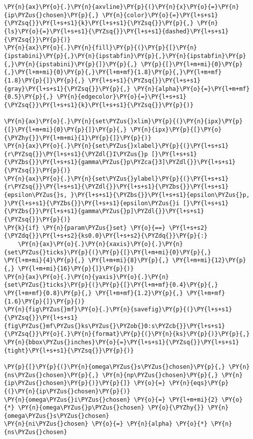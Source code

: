 \begin{Verbatim}[commandchars=\\\{\}]
\PY{n}{ax}\PY{o}{.}\PY{n}{axvline}\PY{p}{(}\PY{n}{x}\PY{o}{=}\PY{n}{ip\PYZus{}chosen}\PY{p}{,} \PY{n}{color}\PY{o}{=}\PY{l+s+s1}{\PYZsq{}}\PY{l+s+s1}{k}\PY{l+s+s1}{\PYZsq{}}\PY{p}{,} \PY{n}{ls}\PY{o}{=}\PY{l+s+s1}{\PYZsq{}}\PY{l+s+s1}{dashed}\PY{l+s+s1}{\PYZsq{}}\PY{p}{)}
\PY{n}{ax}\PY{o}{.}\PY{n}{fill}\PY{p}{(}\PY{p}{[}\PY{n}{ipstabini}\PY{p}{,}\PY{n}{ipstabfin}\PY{p}{,}\PY{n}{ipstabfin}\PY{p}{,}\PY{n}{ipstabini}\PY{p}{]}\PY{p}{,} \PY{p}{[}\PY{l+m+mi}{0}\PY{p}{,}\PY{l+m+mi}{0}\PY{p}{,}\PY{l+m+mf}{1.8}\PY{p}{,}\PY{l+m+mf}{1.8}\PY{p}{]}\PY{p}{,} \PY{l+s+s1}{\PYZsq{}}\PY{l+s+s1}{gray}\PY{l+s+s1}{\PYZsq{}}\PY{p}{,} \PY{n}{alpha}\PY{o}{=}\PY{l+m+mf}{0.5}\PY{p}{,} \PY{n}{edgecolor}\PY{o}{=}\PY{l+s+s1}{\PYZsq{}}\PY{l+s+s1}{k}\PY{l+s+s1}{\PYZsq{}}\PY{p}{)}

\PY{n}{ax}\PY{o}{.}\PY{n}{set\PYZus{}xlim}\PY{p}{(}\PY{n}{ipx}\PY{p}{[}\PY{l+m+mi}{0}\PY{p}{]}\PY{p}{,} \PY{n}{ipx}\PY{p}{[}\PY{o}{\PYZhy{}}\PY{l+m+mi}{1}\PY{p}{]}\PY{p}{)}
\PY{n}{ax}\PY{o}{.}\PY{n}{set\PYZus{}xlabel}\PY{p}{(}\PY{l+s+s1}{r\PYZsq{}}\PY{l+s+s1}{\PYZdl{}I\PYZus{}p [}\PY{l+s+s1}{\PYZbs{}}\PY{l+s+s1}{gamma\PYZus{}p\PYZca{}3]\PYZdl{}}\PY{l+s+s1}{\PYZsq{}}\PY{p}{)}
\PY{n}{ax}\PY{o}{.}\PY{n}{set\PYZus{}ylabel}\PY{p}{(}\PY{l+s+s1}{r\PYZsq{}}\PY{l+s+s1}{\PYZdl{}}\PY{l+s+s1}{\PYZbs{}}\PY{l+s+s1}{epsilon\PYZus{}s, }\PY{l+s+s1}{\PYZbs{}}\PY{l+s+s1}{epsilon\PYZus{}p, }\PY{l+s+s1}{\PYZbs{}}\PY{l+s+s1}{epsilon\PYZus{}i [}\PY{l+s+s1}{\PYZbs{}}\PY{l+s+s1}{gamma\PYZus{}p]\PYZdl{}}\PY{l+s+s1}{\PYZsq{}}\PY{p}{)}
\PY{k}{if} \PY{n}{param\PYZus{}set} \PY{o}{==} \PY{l+s+s2}{\PYZdq{}}\PY{l+s+s2}{ks0.0}\PY{l+s+s2}{\PYZdq{}}\PY{p}{:}
    \PY{n}{ax}\PY{o}{.}\PY{n}{xaxis}\PY{o}{.}\PY{n}{set\PYZus{}ticks}\PY{p}{(}\PY{p}{[}\PY{l+m+mi}{0}\PY{p}{,} \PY{l+m+mi}{4}\PY{p}{,} \PY{l+m+mi}{8}\PY{p}{,} \PY{l+m+mi}{12}\PY{p}{,} \PY{l+m+mi}{16}\PY{p}{]}\PY{p}{)}
\PY{n}{ax}\PY{o}{.}\PY{n}{yaxis}\PY{o}{.}\PY{n}{set\PYZus{}ticks}\PY{p}{(}\PY{p}{[}\PY{l+m+mf}{0.4}\PY{p}{,} \PY{l+m+mf}{0.8}\PY{p}{,} \PY{l+m+mf}{1.2}\PY{p}{,} \PY{l+m+mf}{1.6}\PY{p}{]}\PY{p}{)}
\PY{n}{fig\PYZus{}mf}\PY{o}{.}\PY{n}{savefig}\PY{p}{(}\PY{l+s+s1}{\PYZsq{}}\PY{l+s+s1}{fig\PYZus{}mf\PYZus{}ks\PYZus{}\PYZob{}0:s\PYZcb{}}\PY{l+s+s1}{\PYZsq{}}\PY{o}{.}\PY{n}{format}\PY{p}{(}\PY{n}{ks}\PY{p}{)}\PY{p}{,} \PY{n}{bbox\PYZus{}inches}\PY{o}{=}\PY{l+s+s1}{\PYZsq{}}\PY{l+s+s1}{tight}\PY{l+s+s1}{\PYZsq{}}\PY{p}{)}

\PY{p}{[}\PY{p}{(}\PY{n}{omega\PYZus{}s\PYZus{}chosen}\PY{p}{,} \PY{n}{ns\PYZus{}chosen}\PY{p}{,} \PY{n}{np\PYZus{}chosen}\PY{p}{,} \PY{n}{ip\PYZus{}chosen}\PY{p}{)}\PY{p}{]} \PY{o}{=} \PY{n}{eqs}\PY{p}{(}\PY{n}{ip\PYZus{}chosen}\PY{p}{)}
\PY{n}{omega\PYZus{}i\PYZus{}chosen} \PY{o}{=} \PY{l+m+mi}{2} \PY{o}{*} \PY{n}{omega\PYZus{}p\PYZus{}chosen} \PY{o}{\PYZhy{}} \PY{n}{omega\PYZus{}s\PYZus{}chosen}
\PY{n}{ni\PYZus{}chosen} \PY{o}{=} \PY{n}{alpha} \PY{o}{*} \PY{n}{ns\PYZus{}chosen}



\end{Verbatim}
